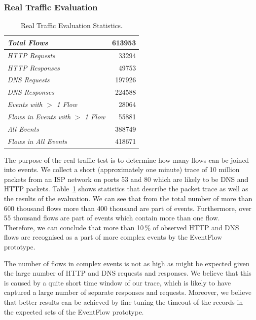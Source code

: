 \subsubsection{Real Traffic Evaluation}

\begin{table}[!tb]
    \caption{Real Traffic Evaluation Statistics.}
    \centering
    \renewcommand{\arraystretch}{1.1}
    \begin{tabular}{|l|r|} \hline
        \textit{Total Flows} & 613953 \\ \hline
        \textit{HTTP Requests} & 33294  \\  \hline
        \textit{HTTP Responses} & 49753  \\  \hline
        \textit{DNS Requests} & 197926  \\  \hline
        \textit{DNS Responses} & 224588  \\  \hline
        \textit{Events with $>$ 1 Flow} & 28064  \\  \hline
        \textit{Flows in Events with $>$ 1 Flow} & 55881  \\  \hline
        \textit{All Events} & 388749 \\  \hline
        \textit{Flows in All Events} & 418671 \\  \hline
    \end{tabular}
    \label{tab:eventflow-stats}
\end{table}

The purpose of the real traffic test is to determine how many flows can be joined into events. We collect a short (approximately one minute) trace of 10 million packets from an ISP network on ports 53 and 80 which are likely to be DNS and HTTP packets. Table~\ref{tab:eventflow-stats} shows statistics that describe the packet trace as well as the results of the evaluation. We can see that from the total number of more than 600 thousand flows more than 400 thousand are part of events. Furthermore, over 55 thousand flows are part of events which contain more than one flow. Therefore, we can conclude that more than 10\,\% of observed HTTP and DNS flows are recognised as a part of more complex events by the EventFlow prototype.

The number of flows in complex events is not as high as might be expected given the large number of HTTP and DNS requests and responses. We believe that this is caused by a quite short time window of our trace, which is likely to have captured a large number of separate responses and requests. Moreover, we believe that better results can be achieved by fine-tuning the timeout of the records in the expected sets of the EventFlow prototype.


